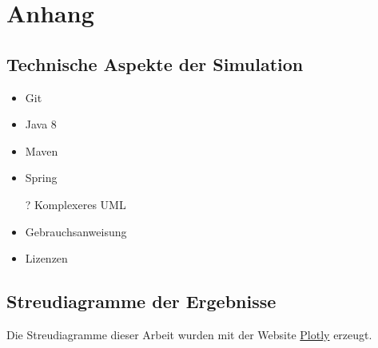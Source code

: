 \section*{Anhang}
\subsection*{Technische Aspekte der Simulation}
\begin{itemize}
	\item Git
	\item Java 8
	\item Maven
	\item Spring
	\item[?] Komplexeres UML
	\item Gebrauchsanweisung
	\item Lizenzen
\end{itemize}
\subsection*{Streudiagramme der Ergebnisse}
Die Streudiagramme dieser Arbeit wurden mit der Website \href{http:plot.ly/plot}{Plotly} erzeugt.
